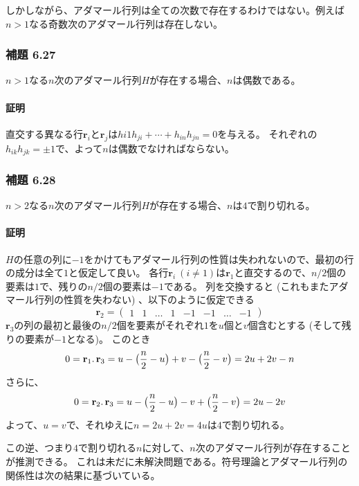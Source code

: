 \documentclass[12pt,a4paper]{article}
\begin{document}
      しかしながら、アダマール行列は全ての次数で存在するわけではない。例えば$n > 1$なる奇数次のアダマール行列は存在しない。

    \subsubsection*{補題 6.27}
      $n > 1$なる$n$次のアダマール行列$H$が存在する場合、$n$は偶数である。

      \paragraph{証明}
        直交する異なる行$\mathbf{r}_i$と$\mathbf{r}_j$は$h{i1}h_{ji} + \cdots + h_{in}h_{jn} = 0$を与える。
        それぞれの$h_{ik}h_{jk} = \pm1$で、よって$n$は偶数でなければならない。

    \subsubsection*{補題 6.28}
      $n > 2$なる$n$次のアダマール行列$H$が存在する場合、$n$は$4$で割り切れる。

      \paragraph{証明}
        $H$の任意の列に$-1$をかけてもアダマール行列の性質は失われないので、最初の行の成分は全て$1$と仮定して良い。
        各行$\mathbf{r}_i \ (i \neq 1)$は$\mathbf{r}_1$と直交するので、$n/2$個の要素は$1$で、残りの$n/2$個の要素は$-1$である。
        列を交換すると (これもまたアダマール行列の性質を失わない) 、以下のように仮定できる
        \[ \mathbf{r}_2 = \begin{pmatrix} 1 & 1 & \ldots & 1 & -1 & -1 & \ldots & -1 \end{pmatrix} \]
        $\mathbf{r}_3$の列の最初と最後の$n/2$個を要素がそれぞれ$1$を$u$個と$v$個含むとする (そして残りの要素が$-1$となる)。 このとき
        \[0 = \mathbf{r}_1 \ldotp \mathbf{r}_3 = u - \big( \frac n2 - u \big) + v - \big( \frac n2 - v \big) = 2u + 2v - n\]
        さらに、
        \[ 0 = \mathbf{r}_2 \ldotp \mathbf{r}_3 = u - \big( \frac n2 - u \big) - v + \big( \frac n2 - v \big) = 2u - 2v \]
        よって、$u = v$で、それゆえに$n = 2u + 2v = 4u$は$4$で割り切れる。
        
      この逆、つまり$4$で割り切れる$n$に対して、$n$次のアダマール行列が存在することが推測できる。
      これは未だに未解決問題である。符号理論とアダマール行列の関係性は次の結果に基づいている。
\end{document}
